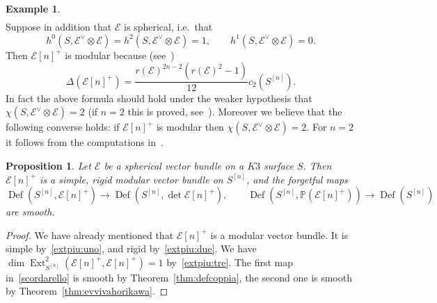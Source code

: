 \documentclass[11pt]{amsart}
\newcommand{\PP}{{\mathbb P}}
\let\mathcal\mathscr
\def\cE{\mathcal{E}}
\DeclareMathOperator{\Def}{Def}
\DeclareMathOperator{\Ext}{Ext}
\def\lra{\longrightarrow}
\newtheorem{prp}[lmm]{Proposition}
\theoremstyle{definition}
\newtheorem{expl}[lmm]{Example}
\theoremstyle{remark}
\begin{document}
\begin{expl}
\begin{eqnarray}
%
\end{eqnarray}
%
Suppose in addition that $\cE$ is spherical, i.e.~that
\begin{equation}
%
h^0(S,\cE^{\vee}\otimes\cE)=h^2(S,\cE^{\vee}\otimes\cE)=1,\qquad h^1(S,\cE^{\vee}\otimes\cE)=0.
%
\end{equation}
%
Then $\cE[n]^{+}$ is modular because (see~\cite[Prop.~3.2]{og:fascik3n})
%
\begin{equation}\label{cidue}
%
\Delta(\cE[n]^{+})   =  \frac{r(\cE)^{2n-2}(r(\cE)^2-1)}{12}c_2(S^{[n]}). 
%
\end{equation}
%
In fact the above formula should hold under the weaker hypothesis that $\chi(S,\cE^{\vee}\otimes\cE)=2$ (if $n=2$ this is proved, 
see~\cite[Prop.~5.4]{og:fascimod}). Moreover we believe that the following converse holds: if $\cE[n]^{+}$ is modular then $\chi(S,\cE^{\vee}\otimes\cE)=2$. For $n=2$ it follows from the computations in~\cite[Eqtn.~(5.4.7)]{og:fascimod}. 
%
\end{expl}
%
%
\begin{prp}
%
Let  $\cE$ be a spherical vector bundle on a $K3$ surface $S$. Then $\cE[n]^{+}$ is a simple, rigid modular vector bundle on $S^{[n]}$, and the forgetful maps
%
\begin{equation}\label{scordarello}
%
\Def(S^{[n]},\cE[n]^{+}) \lra \Def(S^{[n]},\det\cE[n]^{+}),\qquad \Def(S^{[n]},\PP(\cE[n]^{+})) \lra \Def(S^{[n]})
%
\end{equation}
%
are smooth.
%
\end{prp}
%
%
\begin{proof}
%
We have already mentioned that $\cE[n]^{+}$ is a  modular vector bundle. 
It is simple by~\eqref{extpiu:uno}, and rigid by~\eqref{extpiu:due}. We have  $\dim \Ext^2_{S^{[n]}}( \cE[n]^{+},\cE[n]^{+})=1$ by~\eqref{extpiu:tre}. The first map in~\eqref{scordarello} is smooth by Theorem~\ref{thm:defcoppia}, the second one is smooth by  Theorem~\ref{thm:evvivahorikawa}.
%
\end{proof}
%
\end{document}
